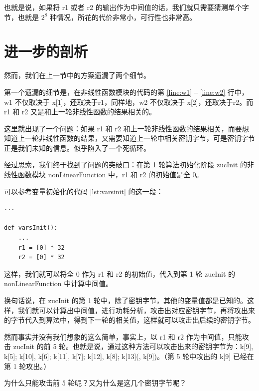 也就是说，如果将 {\cnsls r1} 或者 {\cnsls r2} 的输出作为中间值的话，我们就只需要猜测单个字节，也就是 $2^8$ 种情况，所花的代价非常小，可行性也非常高。

\newpage

\section{进一步的剖析}

然而，我们在上一节中的方案遗漏了两个细节。

第一个遗漏的细节是，在非线性函数模块的代码的第 \ref{line:w1} -- \ref{line:w2} 行中，{\cnsls w1} 不仅取决于 {\cnsls x[1]}，还取决于{\cnsls r1}，同样地，{\cnsls w2} 不仅取决于 {\cnsls x[2]}，还取决于{\cnsls r2}。而 {\cnsls r1} 和 {\cnsls r2} 又是和上一轮非线性函数的结果相关的。

这里就出现了一个问题：如果 {\cnsls r1} 和 {\cnsls r2} 和上一轮非线性函数的结果相关，而要想知道上一轮非线性函数的结果，又需要知道上一轮中相关密钥字节，可是密钥字节正是我们未知的信息。似乎陷入了一个死循环。

经过思索，我们终于找到了问题的突破口：在第 1 轮算法初始化阶段 {\cnsls zucInit} 的非线性函数模块 {\cnsls nonLinearFunction} 中，{\cnsls r1} 和 {\cnsls r2} 的初始值是全 0。

可以参考变量初始化的代码 \ref{lst:varsinit} 的这一段：

\begin{lstlisting}[style=myPython]
...

def varsInit():
    ...
    r1 = [0] * 32
    r2 = [0] * 32
\end{lstlisting}

这样，我们就可以将全 0 作为 {\cnsls r1} 和 {\cnsls r2} 的初始值，代入到第 1 轮 {\cnsls zucInit} 的 {\cnsls nonLinearFunction} 中计算中间值。

换句话说，在 {\cnsls zucInit} 的第 1 轮中，除了密钥字节，其他的变量值都是已知的。这样，我们就可以计算出中间值，进行功耗分析，攻击出对应密钥字节，再将攻出来的字节代入到算法中，得到下一轮的相关值，这样就可以攻击出后续的密钥字节。

\vspace*{0.5\baselineskip}

然而事实并没有我们想象的这么简单，事实上，以 {\cnsls r1} 和 {\cnsls r2} 作为中间值，只能攻击 {\cnsls zucInit} 的前 5 轮。也就是说，通过这种方法可以攻击出来的密钥字节为：{\cnsls k[9], k[5]; k[10], k[6]; k[11], k[7]; k[12], k[8]; k[13](, k[9])}。（第 5 轮中攻出的 {\cnsls k[9]} 已经在第 1 轮攻出。）

为什么只能攻击前 5 轮呢？又为什么是这几个密钥字节呢？

